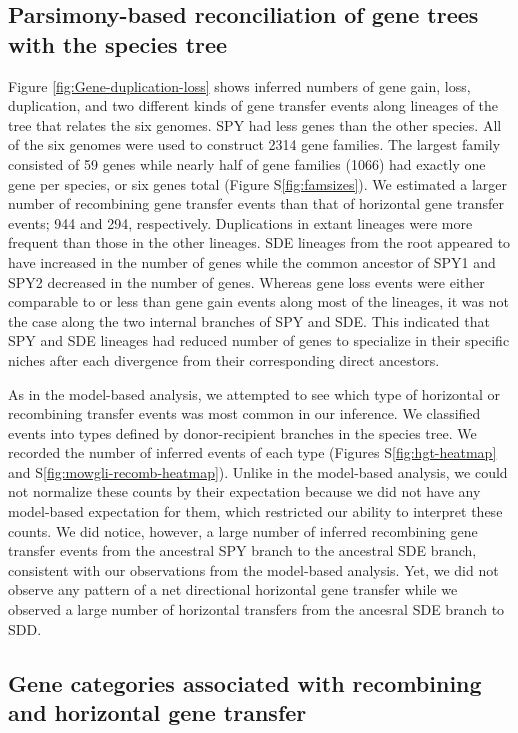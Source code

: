 \documentclass[10pt]{article}
\begin{document}
\subsection*{Parsimony-based reconciliation of gene trees with the species tree}

Figure \ref{fig:Gene-duplication-loss} shows inferred numbers of gene gain,
loss, duplication, and two different kinds of gene transfer events along
lineages of the tree that relates the six genomes. SPY had less genes than the
other species. All of the six genomes were used to construct 2314 gene families.
The largest family consisted of 59 genes while nearly half of gene families
(1066) had exactly one gene per species, or six genes total (Figure
S\ref{fig:famsizes}).  We estimated a larger number of recombining gene transfer
events than that of horizontal gene transfer events; 944 and 294, respectively.
Duplications in extant lineages were more frequent than those in the other
lineages.  SDE lineages from the root appeared to have increased in the number
of genes while the common ancestor of SPY1 and SPY2 decreased in the number of
genes.  Whereas gene loss events were either comparable to or less than gene
gain events along most of the lineages, it was not the case along the two internal
branches of SPY and SDE.  This indicated that SPY and SDE lineages had reduced
number of genes to specialize in their specific niches after each divergence
from their corresponding direct ancestors.

As in the model-based analysis, we attempted to see which type of horizontal or
recombining transfer events was most common in our inference.  We classified
events into types defined by donor-recipient branches in the species tree. We
recorded the number of inferred events of each type (Figures
S\ref{fig:hgt-heatmap} and S\ref{fig:mowgli-recomb-heatmap}). Unlike in the
model-based analysis, we could not normalize these counts by their expectation
because we did not have any model-based expectation for them, which restricted
our ability to interpret these counts. We did notice, however, a large number of
inferred recombining gene transfer events from the ancestral SPY branch to the
ancestral SDE branch, consistent with our observations from the model-based
analysis. Yet, we did not observe any pattern of a net directional horizontal
gene transfer while we observed a large number of horizontal transfers from the
ancesral SDE branch to SDD. 

\subsection*{Gene categories associated with recombining and horizontal gene transfer}
\end{document}
